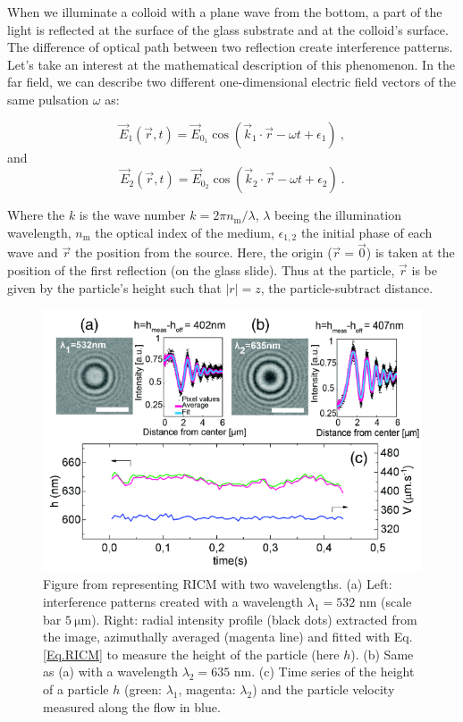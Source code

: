 When we illuminate a colloid with a plane wave from the bottom, a part of the light is reflected at the surface of the glass substrate and at the colloid's surface. The difference of optical path between two reflection create interference patterns. Let's take an interest at the mathematical description of this phenomenon. In the far field, we can describe two different one-dimensional electric field vectors of the same pulsation $\omega$ \cite{f_bohren_absorption_1998} as:

\begin{equation}
	\vec{E}_1(\vec{r}, t) = \vec{E}_{0_1} \cos(\vec{k}_1 \cdot \vec{r} - \omega t + \epsilon_1) ~,
\end{equation}
and
\begin{equation}
	\vec{E}_2(\vec{r}, t) = \vec{E}_{0_2} \cos (\vec{k}_2 \cdot \vec{r} - \omega t + \epsilon_2) ~.
\end{equation}



Where the $k$ is the wave number $k=2\pi n_{\mathrm{m}}/\lambda$, $\lambda$ beeing the illumination wavelength, $n_\mathrm{m}$ the optical index of the medium, $\epsilon_{1,2}$ the initial phase of each wave and $\vec{r}$ the position from the source. Here, the origin ($\vec{r} = \vec{0}$) is taken at the position of the first reflection (on the glass slide). Thus at the particle, $\vec{r}$ is be given by the particle's height such that $|r| = z$, the particle-subtract distance. 

\begin{figure}[H]
	\centering
	\includegraphics[scale=1]{02_body/chapter2/images/RICM.png}
	\caption{Figure from \cite{davies_elastohydrodynamic_2018} representing \gls{RICM} with two wavelengths. (a) Left: interference patterns created with a wavelength $\lambda_1 = 532$ nm (scale bar $ 5~\mathrm{\mu m}$). 
		Right: radial intensity profile (black dots) extracted from the image, azimuthally averaged (magenta line) and fitted with Eq.\ref{Eq.RICM} to measure the height of the particle (here $h$). (b) Same as (a) with a wavelength $\lambda_2 = 635$ nm. (c) Time series of the height of a particle $h$ (green: $ \lambda_1$, magenta: $\lambda_2$) and the particle velocity measured along the flow in blue. }
	\label{fig.RICM}
\end{figure}



